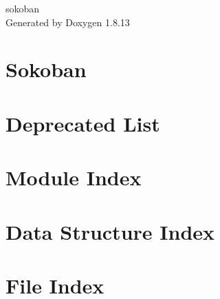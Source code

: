 \documentclass[twoside]{book}
\newcommand{\+}{\discretionary{\mbox{\scriptsize$\hookleftarrow$}}{}{}}
\newcommand{\clearemptydoublepage}{%
  \newpage{\pagestyle{empty}\cleardoublepage}%
}
\begin{document}
\hypersetup{pageanchor=false,
             bookmarksnumbered=true,
             pdfencoding=unicode
            }
\begin{titlepage}
\vspace*{7cm}
\begin{center}%
{\Large sokoban }\\
\vspace*{1cm}
{\large Generated by Doxygen 1.8.13}\\
\end{center}
\end{titlepage}
\clearemptydoublepage
{}
\tableofcontents
\clearemptydoublepage
{}
\hypersetup{pageanchor=true}

\chapter{Sokoban}
\label{index}\hypertarget{index}{}
\chapter{Deprecated List}
\label{deprecated}

\chapter{Module Index}

\chapter{Data Structure Index}

\chapter{File Index}

\end{document}
